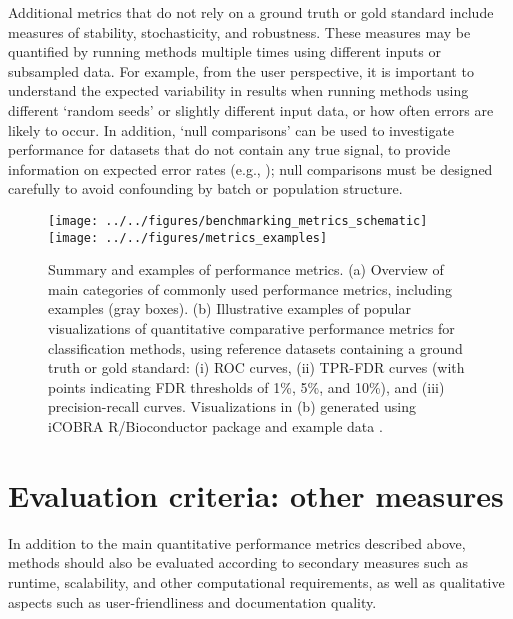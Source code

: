 \documentclass[12pt, a4paper]{article}
\begin{document}
Additional metrics that do not rely on a ground truth or gold standard include measures of stability, stochasticity, and robustness. These measures may be quantified by running methods multiple times using different inputs or subsampled data. For example, from the user perspective, it is important to understand the expected variability in results when running methods using different `random seeds' or slightly different input data, or how often errors are likely to occur. In addition, `null comparisons' can be used to investigate performance for datasets that do not contain any true signal, to provide information on expected error rates (e.g., \citep{Weber2018, Law2014}); null comparisons must be designed carefully to avoid confounding by batch or population structure.





\vskip 5mm

\begin{figure}[H]
\begin{center}
\texttt{[image: ../../figures/benchmarking\_metrics\_schematic]}
\texttt{[image: ../../figures/metrics\_examples]}
\end{center}
\caption{Summary and examples of performance metrics. (a) Overview of main categories of commonly used performance metrics, including examples (gray boxes). (b) Illustrative examples of popular visualizations of quantitative comparative performance metrics for classification methods, using reference datasets containing a ground truth or gold standard: (i) ROC curves, (ii) TPR-FDR curves (with points indicating FDR thresholds of 1\%, 5\%, and 10\%), and (iii) precision-recall curves. Visualizations in (b) generated using iCOBRA R/Bioconductor package and example data \citep{Soneson2016}.}
\label{fig:metrics}
\end{figure}




\section*{Evaluation criteria: other measures}

In addition to the main quantitative performance metrics described above, methods should also be evaluated according to secondary measures such as runtime, scalability, and other computational requirements, as well as qualitative aspects such as user-friendliness and documentation quality.
\end{document}
